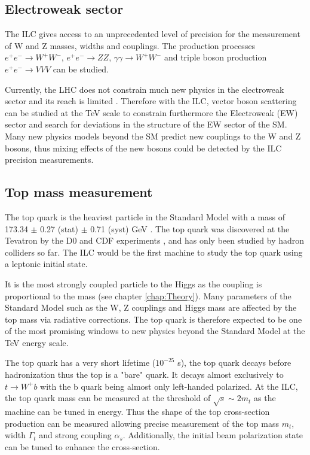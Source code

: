 \subsection{Electroweak sector}

The ILC gives access to an unprecedented level of precision for the measurement of W and Z masses, widths and couplings. The production processes $e^+e^- \rightarrow W^+W^-$, $e^+e^- \rightarrow ZZ$, $\gamma\gamma \rightarrow W^+W^-$ and triple boson production $e^+e^- \rightarrow VVV$ can be studied.

Currently, the LHC does not constrain much new physics in the electroweak sector and its reach is limited \cite{Alboteanu:2008my}. Therefore with the ILC, vector boson scattering can be studied at the TeV scale to constrain furthermore the Electroweak (EW) sector and search for deviations in the structure of the EW sector of the SM. Many new physics models beyond the SM predict new couplings to the W and Z bosons, thus mixing effects of the new bosons could be detected by the ILC precision measurements.

\subsection{Top mass measurement}

The top quark is the heaviest particle in the Standard Model with a mass of 173.34 $\pm$ 0.27 (stat) $\pm$ 0.71 (syst) GeV \cite{ATLAS:2014wva}. The top quark was discovered at the Tevatron by the D0 and CDF experiments \cite{Abe:1995hr, D0:1995jca}, and has only been studied by hadron colliders so far. The ILC would be the first machine to study the top quark using a leptonic initial state.

It is the most strongly coupled particle to the Higgs as the coupling is proportional to the mass (see chapter \ref{chap:Theory}). Many parameters of the Standard Model such as the W, Z couplings and Higgs mass are affected by the top mass via radiative corrections. The top quark is therefore expected to be one of the most promising windows to new physics beyond the Standard Model at the TeV energy scale.

The top quark has a very short lifetime ($10^{-25}$ s), the top quark decays before hadronization thus the top is a "bare" quark. It decays almost exclusively to $t \rightarrow W^+b$ with the b quark being almost only left-handed polarized. At the ILC, the top quark mass can be measured at the threshold of $\sqrt{s} \sim 2 m_t$ as the machine can be tuned in energy. Thus the shape of the top cross-section production can be measured allowing precise measurement of the top mass $m_t$, width $\Gamma_t$ and strong coupling $\alpha_s$. Additionally, the initial beam polarization state can be tuned to enhance the cross-section.

